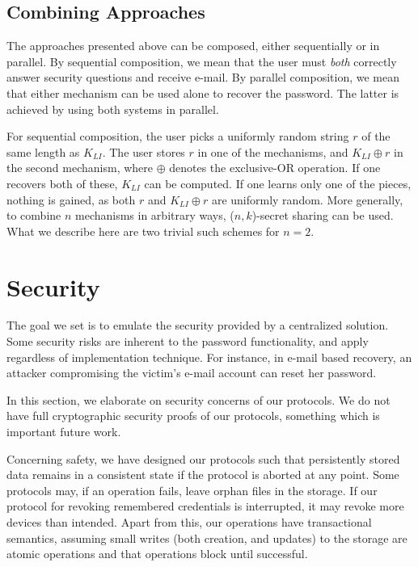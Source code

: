
\subsection{Combining Approaches}

The approaches presented above can be composed, either sequentially or in
parallel. By sequential composition, we mean that the user must \emph{both}
correctly answer security questions and receive e-mail. By parallel
composition, we mean that either mechanism can be used alone to recover the
password. The latter is achieved by using both systems in parallel.

For sequential composition, the user picks a uniformly random string
$r$ of the same length as $K_{LI}$. The user stores $r$ in one of the
mechanisms, and $K_{LI} \oplus r$ in the second mechanism, where $\oplus$
denotes the exclusive-OR operation. If one recovers both of these,
$K_{LI}$ can be computed. If one learns only one of the pieces, nothing
is gained, as both $r$ and $K_{LI} \oplus r$ are uniformly random.
More generally, to combine $n$ mechanisms in arbitrary ways, ($n,k$)-secret
sharing can be used. What we describe here are two trivial such schemes for $n
= 2$.

\section{Security} 

The goal we set is to emulate the security provided by a centralized solution. Some security risks are inherent to the password functionality, and
apply regardless of implementation technique. For instance, in e-mail based
recovery, an attacker compromising the victim's e-mail account can reset her
password.

In this section, we elaborate on security concerns of our protocols. We do not
have full cryptographic security proofs of our protocols, something which is
important future work.

Concerning safety, we have designed our protocols such that
persistently stored data remains in a consistent state if the
protocol is aborted at any point. Some protocols may, if an operation
fails, leave orphan files in the storage. If our protocol for revoking
remembered credentials is interrupted, it may revoke more devices than
intended. Apart from this, our operations have transactional semantics,
assuming small writes (both creation, and updates) to the storage are atomic operations and that
operations block until successful.


